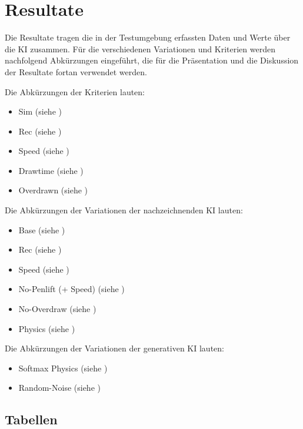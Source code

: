 \chapter{Resultate}\label{chap:r} 

Die Resultate tragen die in der Testumgebung erfassten Daten und Werte über die
KI zusammen. Für die verschiedenen Variationen und Kriterien werden nachfolgend
Abkürzungen eingeführt, die für die Präsentation und die Diskussion der
Resultate fortan verwendet werden.

Die Abkürzungen der Kriterien lauten:
\begin{itemize}
    \item Sim (siehe )
    \item Rec (siehe )
    \item Speed (siehe )
    \item Drawtime  (siehe )
    \item Overdrawn (siehe )
\end{itemize}

Die Abkürzungen der Variationen der nachzeichnenden KI lauten: 
\begin{itemize}
    \item Base (siehe )
    \item Rec (siehe )
    \item Speed (siehe )
    \item No-Penlift (+ Speed) (siehe )
    \item No-Overdraw (siehe )
    \item Physics (siehe )
\end{itemize}

Die Abkürzungen der Variationen der generativen KI lauten:
\begin{itemize}
    \item Softmax Physics (siehe )
    \item Random-Noise (siehe )
\end{itemize}



\section{Tabellen}\label{chap:r_tab} 

